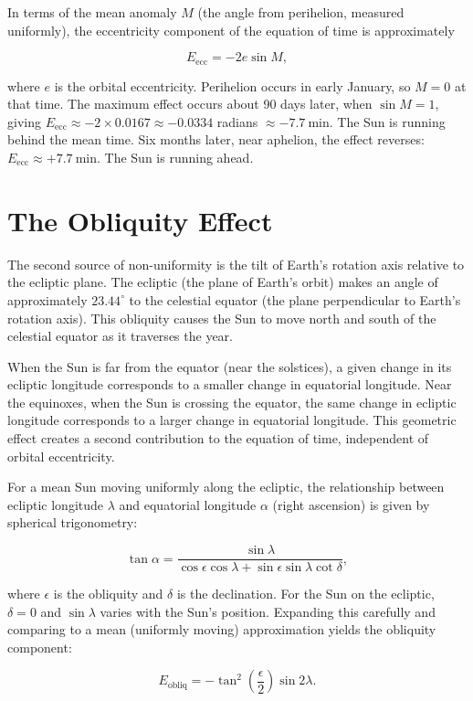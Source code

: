 In terms of the mean anomaly $M$ (the angle from perihelion, measured uniformly), the eccentricity component of the equation of time is approximately

\[
  E_{\text{ecc}} = -2e \sin M,
\]

where $e$ is the orbital eccentricity. Perihelion occurs in early January, so $M = 0$ at that time. The maximum effect occurs about 90 days later, when $\sin M = 1$, giving $E_{\text{ecc}} \approx -2 \times 0.0167 \approx -0.0334$ radians $\approx \SI{-7.7}{\minute}$. The Sun is running behind the mean time. Six months later, near aphelion, the effect reverses: $E_{\text{ecc}} \approx +\SI{7.7}{\minute}$. The Sun is running ahead.

\section{The Obliquity Effect}

The second source of non-uniformity is the tilt of Earth's rotation axis relative to the ecliptic plane. The ecliptic (the plane of Earth's orbit) makes an angle of approximately $23.44^{\circ}$ to the celestial equator (the plane perpendicular to Earth's rotation axis). This obliquity causes the Sun to move north and south of the celestial equator as it traverses the year.

When the Sun is far from the equator (near the solstices), a given change in its ecliptic longitude corresponds to a smaller change in equatorial longitude. Near the equinoxes, when the Sun is crossing the equator, the same change in ecliptic longitude corresponds to a larger change in equatorial longitude. This geometric effect creates a second contribution to the equation of time, independent of orbital eccentricity.

For a mean Sun moving uniformly along the ecliptic, the relationship between ecliptic longitude $\lambda$ and equatorial longitude $\alpha$ (right ascension) is given by spherical trigonometry:

\[
  \tan \alpha = \frac{\sin \lambda}{\cos \epsilon \cos \lambda + \sin \epsilon \sin \lambda \cot \delta},
\]

where $\epsilon$ is the obliquity and $\delta$ is the declination. For the Sun on the ecliptic, $\delta = 0$ and $\sin \lambda$ varies with the Sun's position. Expanding this carefully and comparing to a mean (uniformly moving) approximation yields the obliquity component:

\[
  E_{\text{obliq}} = -\tan^2 \left(\frac{\epsilon}{2}\right) \sin 2\lambda.
\]

